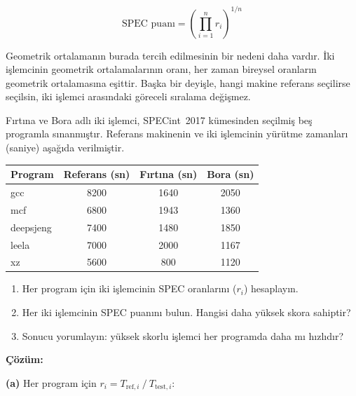 \begin{equation}
\text{SPEC puanı} = \left(\prod_{i=1}^{n} r_i\right)^{1/n}
\label{eq:spec-puan}
\end{equation}

\noindent Geometrik ortalamanın burada tercih edilmesinin bir nedeni daha vardır. İki işlemcinin geometrik ortalamalarının oranı, her zaman bireysel oranların geometrik ortalamasına eşittir. Başka bir deyişle, hangi makine referans seçilirse seçilsin, iki işlemci arasındaki göreceli sıralama değişmez.

\begin{ornek}[2.9]
Fırtına ve Bora adlı iki işlemci, SPECint~2017 kümesinden seçilmiş beş programla sınanmıştır. Referans makinenin ve iki işlemcinin yürütme zamanları (saniye) aşağıda verilmiştir.

\begin{center}
\small
\begin{tabular}{lccc}
\toprule
\textbf{Program} & \textbf{Referans (sn)} & \textbf{Fırtına (sn)} & \textbf{Bora (sn)} \\
\midrule
gcc         & 8200 & 1640 & 2050 \\
mcf         & 6800 & 1943 & 1360 \\
deepsjeng   & 7400 & 1480 & 1850 \\
leela       & 7000 & 2000 & 1167 \\
xz          & 5600 & 800  & 1120 \\
\bottomrule
\end{tabular}
\end{center}

\begin{enumerate}[label=(\alph*)]
\item Her program için iki işlemcinin SPEC oranlarını ($r_i$) hesaplayın.
\item Her iki işlemcinin SPEC puanını bulun. Hangisi daha yüksek skora sahiptir?
\item Sonucu yorumlayın: yüksek skorlu işlemci her programda daha mı hızlıdır?
\end{enumerate}

\textbf{Çözüm:}

\textbf{(a)} Her program için $r_i = T_{\text{ref},i} \mathbin{/} T_{\text{test},i}$:


\end{ornek}
